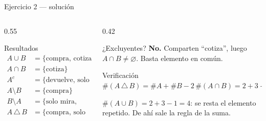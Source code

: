 \documentclass[aspectratio=169,10pt]{beamer}
\begin{document}
\begin{frame}{Ejercicio 2 — solución}
  \begin{columns}[T,onlytextwidth]
    \begin{column}{0.55\textwidth}
      \begin{block}{Resultados}
        \footnotesize
        \begin{align*}
          A\cup B &= \{\text{compra, cotiza, solo mira, reclama}\}\\[0.15em]
          A\cap B &= \{\text{cotiza}\}\\[0.15em]
          A^{c}   &= \{\text{devuelve, solo mira, reclama}\}\\[0.15em]
          A\setminus B &= \{\text{compra}\}\\[0.15em]
          B\setminus A &= \{\text{solo mira, reclama}\}\\[0.15em]
          A\,\triangle\,B &= \{\text{compra, solo mira, reclama}\}
        \end{align*}
      \end{block}
    \end{column}
    \begin{column}{0.42\textwidth}
      \begin{exampleblock}{¿Excluyentes?}
        \footnotesize
        \textbf{No.} Comparten ``cotiza'', luego
        $A\cap B\neq\varnothing$. Basta  elemento en común.
      \end{exampleblock}
      \begin{alertblock}{Verificación}
        \footnotesize
        $\#(A\,\triangle\,B)=\#A+\#B-2\,\#(A\cap B)=2+3-2=3$ \checkmark

        \vspace{0.15cm}
        $\#(A\cup B)=2+3-1=4$: se resta el elemento repetido. De ahí sale la
        regla de la suma.
      \end{alertblock}
    \end{column}
  \end{columns}
\end{frame}
\end{document}
